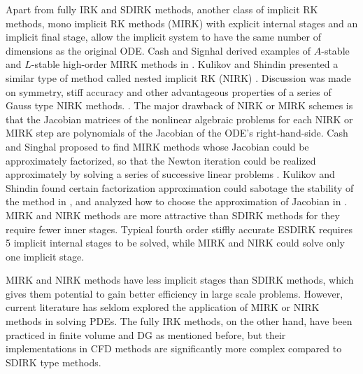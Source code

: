 Apart from fully IRK and SDIRK methods,
another class of implicit RK methods,
mono implicit RK methods (MIRK)
\cite{cash1975classMIRKOrig}
with explicit internal stages and
an implicit final
stage,
allow the implicit system to
have the same number of dimensions
as the original ODE.
Cash and Signhal derived examples of
$A$-stable and $L$-stable high-order
MIRK methods in
\cite{cash1977clasMIRK1,cash1982monoMIRK2}.
Kulikov and Shindin presented a similar type
of method called nested implicit RK (NIRK)
\cite{kulikov2006familyNIRKOrig}.
Discussion was made on symmetry, stiff accuracy and
other advantageous properties of a series of Gauss type
NIRK methods.
\cite{kulikov2009adaptive}.
The major drawback of NIRK or MIRK schemes is that
the Jacobian matrices of the nonlinear algebraic problems
for each NIRK or MIRK step are
polynomials of the Jacobian of the ODE's right-hand-side.
Cash and Singhal proposed to find MIRK methods whose
Jacobian could be approximately factorized,
so that the Newton iteration
could be realized approximately by solving a series of successive linear
problems \cite{cash1982monoMIRK2}.
Kulikov and Shindin found certain factorization
approximation could sabotage the stability of
the method in
\cite{kulikov2009adaptive},
and analyzed how to choose the approximation of
Jacobian in
\cite{kulikov2007asymptotic}.
MIRK and NIRK methods are more attractive than SDIRK methods
for they require fewer inner stages.
Typical fourth order
stiffly accurate ESDIRK requires 5 implicit internal stages to be
solved,
while MIRK and NIRK could
solve only one implicit stage.


MIRK and NIRK methods have less
implicit stages than SDIRK methods,
which gives them potential to gain better efficiency in
large scale problems.
However, current literature has seldom explored
the application of MIRK or NIRK methods in
solving PDEs.
The fully IRK methods, on the other hand,
have been practiced in
finite volume \cite{jameson2017evaluation} and
DG \cite{pazner2017stage}
as mentioned before,
but their implementations
in CFD methods are significantly more
complex compared to SDIRK type methods.

